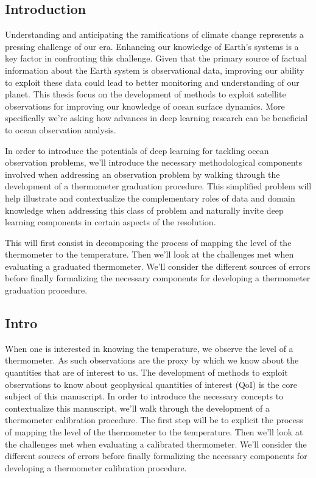 \begin{bibunit}

\chapter*{Introduction}

Understanding and anticipating the ramifications of climate change represents a pressing challenge of our era.
Enhancing our knowledge of Earth's systems is a key factor in confronting this challenge.
  Given that the primary source of factual information about the Earth system is observational data, improving our ability to exploit these data could lead to better monitoring and understanding of our planet.
  This thesis focus on the development of methods to exploit satellite observations for improving our knowledge of ocean surface dynamics. 
  More specifically we're asking how advances in deep learning research can be beneficial to ocean observation analysis.
  
  In order to introduce the potentials of deep learning for tackling ocean observation problems, we'll introduce the necessary methodological components involved when addressing an observation problem by walking through the development of a thermometer graduation procedure. This simplified problem will help illustrate and contextualize the complementary roles of data and domain knowledge when addressing this class of problem and naturally invite deep learning components in certain aspects of the resolution. 

  This will first consist in decomposing the process of mapping the level of the thermometer to the temperature. Then we'll look at the challenges met when evaluating a graduated thermometer. We'll consider the different sources of errors before finally formalizing the necessary components for developing a thermometer graduation procedure.


  \section{Intro}
 When  one is interested in knowing the temperature, we observe the level of a thermometer.
As such observations are the proxy by which we know about the quantities that are of interest to us. 
  The development of methods to exploit observations to know about geophysical quantities of interest (QoI) is the core subject of this manuscript. 
  In order to introduce the necessary concepts to contextualize this manuscript, we'll walk through the development of a thermometer calibration procedure.
  The first step will be to explicit the process of mapping the level of the thermometer to the temperature.
  Then we'll look at the challenges met when evaluating a calibrated thermometer.
  We'll consider the different sources of errors before finally formalizing the necessary components for developing a thermometer calibration procedure.


\end{bibunit}
